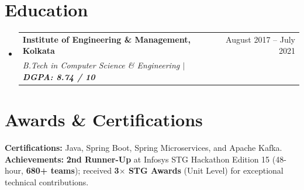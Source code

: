 \documentclass[letterpaper,11pt]{article}
\makeatletter
\newcommand{\resumeSubheading}[4]{
  \vspace{-2pt}\item
    \begin{tabular*}{0.97\textwidth}[t]{l@{\extracolsep{\fill}}r}
      \textbf{#1} & #2 \\
      \textit{\small#3} & \textit{\small #4} \\
    \end{tabular*}\vspace{-7pt}
}
\newcommand{\resumeSubHeadingListStart}{\begin{itemize}[leftmargin=0.15in, label={}]}
\newcommand{\resumeSubHeadingListEnd}{\end{itemize}}
\makeatother
\begin{document}
\section{Education}
\resumeSubHeadingListStart
  \resumeSubheading
    {Institute of Engineering \& Management, Kolkata}{August 2017 -- July 2021}
    {B.Tech in Computer Science \& Engineering $|$ \textbf{DGPA: 8.74 / 10}}{}
\resumeSubHeadingListEnd

\section{Awards \& Certifications}
\begin{itemize}[leftmargin=0.15in, label={}]
  \small{\item{
    \textbf{Certifications:} Java, Spring Boot, Spring Microservices, and Apache Kafka. \\[2pt]
    \textbf{Achievements:} \textbf{2nd Runner-Up} at Infosys STG Hackathon Edition 15 (48-hour, \textbf{680+ teams}); received \textbf{3$\times$ STG Awards} (Unit Level) for exceptional technical contributions.
  }}
\end{itemize}
\end{document}
